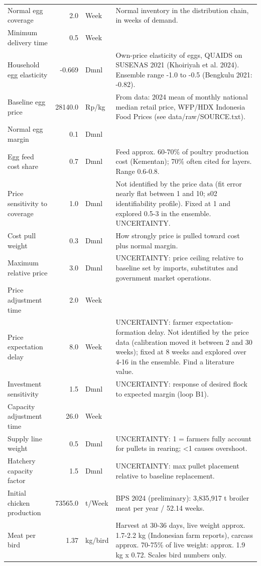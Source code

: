 \documentclass[10pt,twocolumn,a4paper]{article}
\begin{document}
\begin{longtable}{>{\raggedright\arraybackslash}p{4.2cm}r>{\raggedright\arraybackslash}p{2.4cm}>{\raggedright\arraybackslash}p{7.2cm}}
Normal egg coverage & 2.0 & Week & Normal inventory in the distribution chain, in weeks of demand. \\
Minimum delivery time & 0.5 & Week &  \\
Household egg elasticity & -0.669 & Dmnl & Own-price elasticity of eggs, QUAIDS on SUSENAS 2021 (Khoiriyah et al. 2024). Ensemble range -1.0 to -0.5 (Bengkulu 2021: -0.82). \\
Baseline egg price & 28140.0 & Rp/kg & From data: 2024 mean of monthly national median retail price, WFP/HDX Indonesia Food Prices (see data/raw/SOURCE.txt). \\
Normal egg margin & 0.1 & Dmnl &  \\
Egg feed cost share & 0.7 & Dmnl & Feed approx. 60-70\% of poultry production cost (Kementan); 70\% often cited for layers. Range 0.6-0.8. \\
Price sensitivity to coverage & 1.0 & Dmnl & Not identified by the price data (fit error nearly flat between 1 and 10; s02 identifiability profile). Fixed at 1 and explored 0.5-3 in the ensemble. UNCERTAINTY. \\
Cost pull weight & 0.3 & Dmnl & How strongly price is pulled toward cost plus normal margin. \\
Maximum relative price & 3.0 & Dmnl & UNCERTAINTY: price ceiling relative to baseline set by imports, substitutes and government market operations. \\
Price adjustment time & 2.0 & Week &  \\
Price expectation delay & 8.0 & Week & UNCERTAINTY: farmer expectation-formation delay. Not identified by the price data (calibration moved it between 2 and 30 weeks); fixed at 8 weeks and explored over 4-16 in the ensemble. Find a literature value. \\
Investment sensitivity & 1.5 & Dmnl & UNCERTAINTY: response of desired flock to expected margin (loop B1). \\
Capacity adjustment time & 26.0 & Week &  \\
Supply line weight & 0.5 & Dmnl & UNCERTAINTY: 1 = farmers fully account for pullets in rearing; \textless{}1 causes overshoot. \\
Hatchery capacity factor & 1.5 & Dmnl & UNCERTAINTY: max pullet placement relative to baseline replacement. \\
Initial chicken production & 73565.0 & t/Week & BPS 2024 (preliminary): 3,835,917 t broiler meat per year / 52.14 weeks. \\
Meat per bird & 1.37 & kg/bird & Harvest at 30-36 days, live weight approx. 1.7-2.2 kg (Indonesian farm reports), carcass approx. 70-75\% of live weight: approx. 1.9 kg x 0.72. Scales bird numbers only. \\

\end{longtable}
\end{document}
